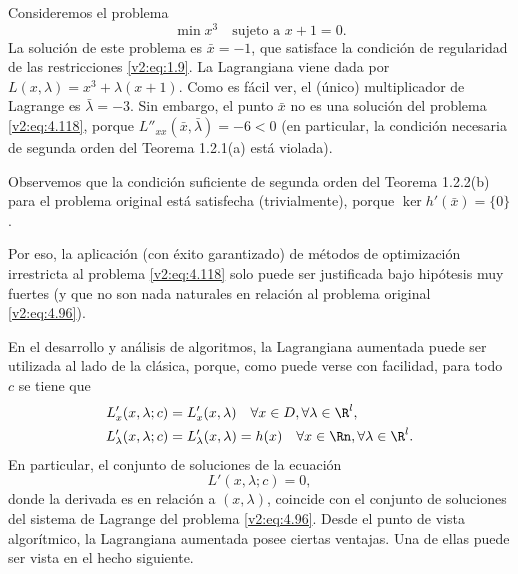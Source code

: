 \begin{example}\label{v2:exa:4.4.1}
    Consideremos el problema
    \[
        \min x^3 \quad \text{sujeto a } x + 1 = 0.
    \]
    La solución de este problema es $\bar{x} = -1$, que satisface la condición de regularidad de las restricciones \eqref{v2:eq:1.9}. La Lagrangiana viene dada por $L(x, \lambda) = x^3 + \lambda(x+1)$. Como es fácil ver, el (único) multiplicador de Lagrange es $\bar{\lambda} = -3$. Sin embargo, el punto $\bar{x}$ no es una solución del problema \eqref{v2:eq:4.118}, porque $L''_{xx}(\bar{x}, \bar{\lambda}) = -6 < 0$ (en particular, la condición necesaria de segunda orden del Teorema 1.2.1(a) está violada).
    
    Observemos que la condición suficiente de segunda orden del Teorema 1.2.2(b) para el problema original está satisfecha (trivialmente), porque $\ker h'(\bar{x}) = \{0\}$.
    
    Por eso, la aplicación (con éxito garantizado) de métodos de optimización irrestricta al problema \eqref{v2:eq:4.118} solo puede ser justificada bajo hipótesis muy fuertes (y que no son nada naturales en relación al problema original \eqref{v2:eq:4.96}).
\end{example}

En el desarrollo y análisis de algoritmos, la Lagrangiana aumentada puede ser utilizada al lado de la clásica, porque, como puede verse con facilidad, para todo $c$ se tiene que
\begin{align*}
    L'_x(x, \lambda; c) &= L'_x(x, \lambda) \quad \forall x \in D, \forall \lambda \in \R^l, \\
    L'_\lambda(x, \lambda; c) &= L'_\lambda(x, \lambda) = h(x) \quad \forall x \in \Rn, \forall \lambda \in \R^l.
\end{align*}
En particular, el conjunto de soluciones de la ecuación
\[
    L'(x, \lambda; c) = 0,
\]
donde la derivada es en relación a $(x, \lambda)$, coincide con el conjunto de soluciones del sistema de Lagrange del problema \eqref{v2:eq:4.96}. Desde el punto de vista algorítmico, la Lagrangiana aumentada posee ciertas ventajas. Una de ellas puede ser vista en el hecho siguiente.

